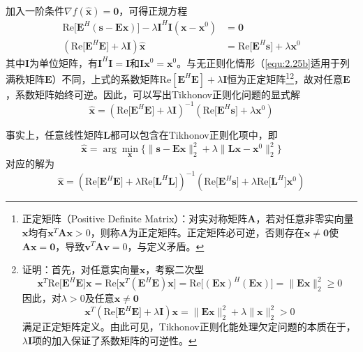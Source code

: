 \documentclass[12pt]{article}
\begin{document}
加入一阶条件$\nabla f(\hat{\bm{x}})=\bm{0}$，可得正规方程
\begin{align}
    \mathrm{Re}\bigg[\mathbf{E}^H\left(\bm{s}-\mathbf{E}\bm{x}\right)\bigg]-\lambda\mathbf{I}^H\mathbf{I}(\bm{x}-\bm{x}^0)&=\bm{0} \\
    \left(\mathrm{Re}\bigg[\mathbf{E}^H\mathbf{E}\bigg]+\lambda\mathbf{I}\right)\hat{\bm{x}}&=\mathrm{Re}\bigg[\mathbf{E}^H\bm{s}\bigg]+\lambda\bm{x}^0
\end{align}
其中$\mathbf{I}$为单位矩阵，有$\mathbf{I}^H\mathbf{I}=\mathbf{I}$和$\mathbf{I}\bm{x}^0=\bm{x}^0$。与无正则化情形（\autoref{equ:2.25b}适用于列满秩矩阵$\mathbf{E}$）不同，上式的系数矩阵$\mathrm{Re}[\mathbf{E}^H\mathbf{E}]+\lambda\mathbf{I}$恒为正定矩阵\footnote{正定矩阵（Positive Definite Matrix）：对实对称矩阵$\mathbf{A}$，若对任意非零实向量$\bm{x}$均有$\bm{x}^T\mathbf{A}\bm{x}>0$，则称$\mathbf{A}$为正定矩阵。正定矩阵必可逆，否则存在$\bm{x}\neq\bm{0}$使$\mathbf{A}\bm{x}=\bm{0}$，导致$\bm{v}^T\mathbf{A}\bm{v}=0$，与定义矛盾。}\footnote{证明：首先，对任意实向量$\bm{x}$，考察二次型
\begin{equation}
    \bm{x}^T\mathrm{Re}\bigg[\mathbf{E}^H\mathbf{E}\bigg]\bm{x}=\mathrm{Re}\bigg[\bm{x}^T(\mathbf{E}^H\mathbf{E})\bm{x}\bigg]=\mathrm{Re}\bigg[(\mathbf{E}\bm{x})^H(\mathbf{E}\bm{x})\bigg]=\|\mathbf{E}\bm{x}\|_2^2\ge 0
\end{equation}
因此，对$\lambda>0$及任意$\bm{x}\neq\bm{0}$
\begin{equation}
    \bm{x}^T\left(\mathrm{Re}\bigg[\mathbf{E}^H\mathbf{E}\bigg]+\lambda\mathbf{I}\right)\bm{x}=\|\mathbf{E}\bm{x}\|_2^2+\lambda\|\bm{x}\|_2^2>0
\end{equation}
满足正定矩阵定义。由此可见，Tikhonov正则化能处理欠定问题的本质在于，$\lambda\mathbf{I}$项的加入保证了系数矩阵的可逆性。}，故对任意$\mathbf{E}$，系数矩阵始终可逆。因此，可以写出Tikhonov正则化问题的显式解
\begin{equation}
    \boxed{\hat{\bm{x}}=\left(\mathrm{Re}\bigg[\mathbf{E}^H\mathbf{E}\bigg]+\lambda\mathbf{I}\right)^{-1}\left(\mathrm{Re}\bigg[\mathbf{E}^H\bm{s}\bigg]+\lambda\bm{x}^0\right)}
    \label{equ:2.34}
\end{equation}

事实上，任意线性矩阵$\mathbf{L}$都可以包含在Tikhonov正则化项中，即
\begin{equation}
    \hat{\bm{x}}=\arg\min_{\bm{x}}\{\|\bm{s}-\mathbf{E}\bm{x}\|_2^2+\lambda\|\mathbf{L}\bm{x}-\bm{x}^0\|_2^2\}
\end{equation}
对应的解为
\begin{equation}
    \hat{\bm{x}}=\left(\mathrm{Re}\bigg[\mathbf{E}^H\mathbf{E}\bigg]+\lambda\mathrm{Re}\bigg[\mathbf{L}^H\mathbf{L}\bigg]\right)^{-1}\left(\mathrm{Re}\bigg[\mathbf{E}^H\bm{s}\bigg]+\lambda\mathrm{Re}\bigg[\mathbf{L}^H\bigg]\bm{x}^0\right)
    \label{equ:2.35}
\end{equation}
\end{document}
